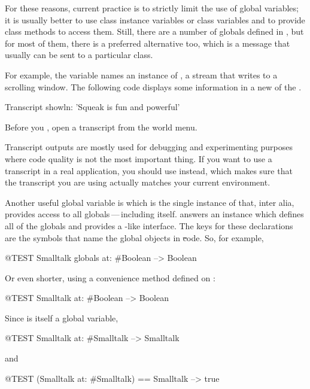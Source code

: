 \documentclass[a4paper,10pt,twoside]{book}
\begin{document}
For these reasons, current practice is to strictly limit the use of global variables; it is usually better to use class instance variables or class variables and to provide class methods to access them.
Still, there are a number of globals defined in \sq, but for most of them, there is a preferred alternative too, which is a message that usually can be sent to a particular class.

For example, the variable  names an instance of , a stream that writes to a scrolling window.
The following code displays some information in a new of the .

\begin{code}{}
Transcript showln: 'Squeak is fun and powerful'
\end{code}

\noindent
Before you , open a transcript from the world menu.


Transcript outputs are mostly used for debugging and experimenting purposes where code quality is not the most important thing.
If you want to use a transcript in a real application, you should use  instead, which makes sure that the transcript you are using actually matches your current \sq environment.

Another useful global variable is  which is the single instance of  that, inter alia, provides access to all globals\,---\,including  itself.
 answers an  instance which defines all of the globals and provides a -like interface.
The keys for these declarations are the symbols that name the global objects in \st code.
So, for example,
\begin{code}{@TEST}
Smalltalk globals at: #Boolean --> Boolean
\end{code}
Or even shorter, using a convenience method defined on :
\begin{code}{@TEST}
Smalltalk at: #Boolean --> Boolean
\end{code}
Since  is itself a global variable,
\begin{code}{@TEST}
Smalltalk at: #Smalltalk --> Smalltalk
\end{code}
and
\begin{code}{@TEST}
(Smalltalk at: #Smalltalk) == Smalltalk --> true
\end{code}
\end{document}
